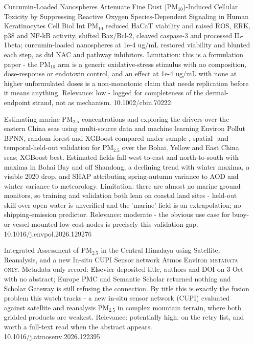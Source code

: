 \documentclass[10pt]{article}
\begin{document}
{Curcumin-Loaded Nanospheres Attenuate Fine Dust (PM$_{10}$)-Induced Cellular Toxicity by Suppressing Reactive Oxygen Species-Dependent Signaling in Human Keratinocytes}
{Cell Biol Int}
{PM$_{10}$ reduced HaCaT viability and raised ROS, ERK, p38 and NF-kB activity, shifted Bax/Bcl-2, cleaved caspase-3 and processed IL-1beta; curcumin-loaded nanospheres at 1e-4 ug/mL restored viability and blunted each step, as did NAC and pathway inhibitors. Limitation: this is a formulation paper - the PM$_{10}$ arm is a generic oxidative-stress stimulus with no composition, dose-response or endotoxin control, and an effect at 1e-4 ug/mL with none at higher unformulated doses is a non-monotonic claim that needs replication before it means anything. Relevance: low - logged for completeness of the dermal-endpoint strand, not as mechanism.}
{10.1002/cbin.70222}

\par{}\baselineskip{}\baselineskip
{}

{Estimating marine PM$_{2.5}$ concentrations and exploring the drivers over the eastern China seas using multi-source data and machine learning}
{Environ Pollut}
{BPNN, random forest and XGBoost compared under sample-, spatial- and temporal-held-out validation for PM$_{2.5}$ over the Bohai, Yellow and East China seas; XGBoost best. Estimated fields fall west-to-east and north-to-south with maxima in Bohai Bay and off Shandong, a declining trend with winter maxima, a visible 2020 drop, and SHAP attributing spring-autumn variance to AOD and winter variance to meteorology. Limitation: there are almost no marine ground monitors, so training and validation both lean on coastal land sites - held-out skill over open water is unverified and the 'marine' field is an extrapolation; no shipping-emission predictor. Relevance: moderate - the obvious use case for buoy- or vessel-mounted low-cost nodes is precisely this validation gap.}
{10.1016/j.envpol.2026.129276}

\par{}\baselineskip{}\baselineskip
{}

{Integrated Assessment of PM$_{2.5}$ in the Central Himalaya using Satellite, Reanalysis, and a new In-situ CUPI Sensor network}
{Atmos Environ}
{\textsc{metadata only.} Metadata-only record: Elsevier deposited title, authors and DOI on 3 Oct with no abstract; Europe PMC and Semantic Scholar returned nothing and Scholar Gateway is still refusing the connection. By title this is exactly the fusion problem this watch tracks - a new in-situ sensor network (CUPI) evaluated against satellite and reanalysis PM$_{2.5}$ in complex mountain terrain, where both gridded products are weakest. Relevance: potentially high; on the retry list, and worth a full-text read when the abstract appears.}
{10.1016/j.atmosenv.2026.122395}
\end{document}
